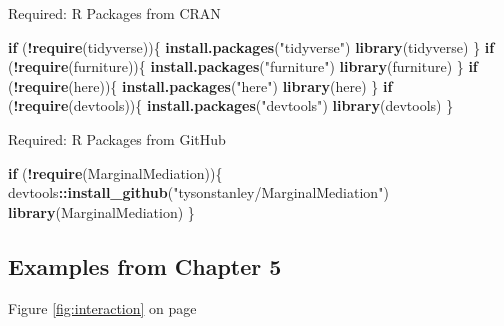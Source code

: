 \documentclass[]{DissertateUSU}
\newenvironment{Shaded}{\begin{snugshade}}{\end{snugshade}}
\newcommand{\KeywordTok}[1]{\textcolor[rgb]{0.13,0.29,0.53}{\textbf{#1}}}
\newcommand{\StringTok}[1]{\textcolor[rgb]{0.31,0.60,0.02}{#1}}
\newcommand{\ControlFlowTok}[1]{\textcolor[rgb]{0.13,0.29,0.53}{\textbf{#1}}}
\newcommand{\OperatorTok}[1]{\textcolor[rgb]{0.81,0.36,0.00}{\textbf{#1}}}
\newcommand{\NormalTok}[1]{#1}
\begin{document}
\singlespace

Required: R Packages from CRAN

\small

\begin{Shaded}
\begin{Highlighting}[]
\ControlFlowTok{if}\NormalTok{ (}\OperatorTok{!}\KeywordTok{require}\NormalTok{(tidyverse))\{}
  \KeywordTok{install.packages}\NormalTok{(}\StringTok{"tidyverse"}\NormalTok{)}
  \KeywordTok{library}\NormalTok{(tidyverse)}
\NormalTok{\}}
\ControlFlowTok{if}\NormalTok{ (}\OperatorTok{!}\KeywordTok{require}\NormalTok{(furniture))\{}
  \KeywordTok{install.packages}\NormalTok{(}\StringTok{"furniture"}\NormalTok{)}
  \KeywordTok{library}\NormalTok{(furniture)}
\NormalTok{\}}
\ControlFlowTok{if}\NormalTok{ (}\OperatorTok{!}\KeywordTok{require}\NormalTok{(here))\{}
  \KeywordTok{install.packages}\NormalTok{(}\StringTok{"here"}\NormalTok{)}
  \KeywordTok{library}\NormalTok{(here)}
\NormalTok{\}}
\ControlFlowTok{if}\NormalTok{ (}\OperatorTok{!}\KeywordTok{require}\NormalTok{(devtools))\{}
  \KeywordTok{install.packages}\NormalTok{(}\StringTok{"devtools"}\NormalTok{)}
  \KeywordTok{library}\NormalTok{(devtools)}
\NormalTok{\}}
\end{Highlighting}
\end{Shaded}

\normalsize

Required: R Packages from GitHub

\small

\begin{Shaded}
\begin{Highlighting}[]
\ControlFlowTok{if}\NormalTok{ (}\OperatorTok{!}\KeywordTok{require}\NormalTok{(MarginalMediation))\{}
\NormalTok{  devtools}\OperatorTok{::}\KeywordTok{install_github}\NormalTok{(}\StringTok{"tysonstanley/MarginalMediation"}\NormalTok{)}
  \KeywordTok{library}\NormalTok{(MarginalMediation)}
\NormalTok{\}}
\end{Highlighting}
\end{Shaded}

\normalsize

\clearpage

\subsection*{Examples from Chapter 5}\label{examples-from-chapter-5}

Figure \ref{fig:interaction} on page \pageref{fig:interaction}
\end{document}

